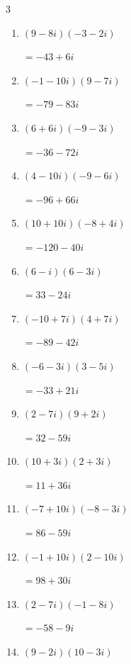 \begin{multicols}{3}
\begin{enumerate}
  \item $\displaystyle (9-8i)(-3-2i)$

        $\displaystyle =-43+6i$

  \item $\displaystyle (-1-10i)(9-7i)$

        $\displaystyle =-79-83i$

  \item $\displaystyle (6+6i)(-9-3i)$

        $\displaystyle =-36-72i$

  \item $\displaystyle (4-10i)(-9-6i)$

        $\displaystyle =-96+66i$

  \item $\displaystyle (10+10i)(-8+4i)$

        $\displaystyle =-120-40i$

  \item $\displaystyle (6-i)(6-3i)$

        $\displaystyle =33-24i$

  \item $\displaystyle (-10+7i)(4+7i)$

        $\displaystyle =-89-42i$

  \item $\displaystyle (-6-3i)(3-5i)$

        $\displaystyle =-33+21i$

  \item $\displaystyle (2-7i)(9+2i)$

        $\displaystyle =32-59i$

  \item $\displaystyle (10+3i)(2+3i)$

        $\displaystyle =11+36i$

  \item $\displaystyle (-7+10i)(-8-3i)$

        $\displaystyle =86-59i$

  \item $\displaystyle (-1+10i)(2-10i)$

        $\displaystyle =98+30i$

  \item $\displaystyle (2-7i)(-1-8i)$

        $\displaystyle =-58-9i$

  \item $\displaystyle (9-2i)(10-3i)$


\end{enumerate}
\end{multicols}

